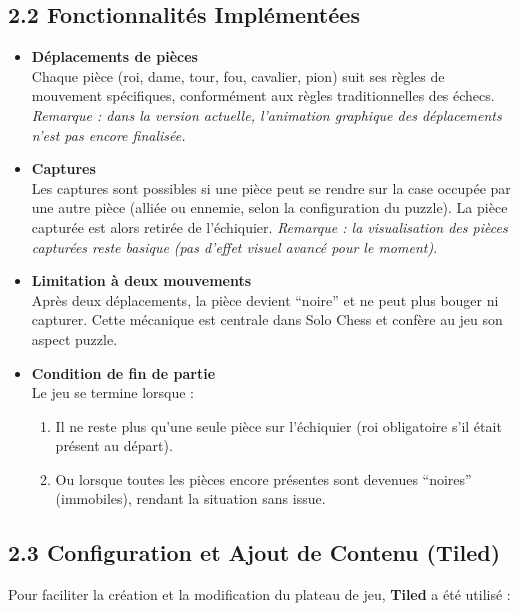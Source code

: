 \documentclass[11pt,a4paper]{article}
\begin{document}
\subsection*{2.2 Fonctionnalités Implémentées}
\begin{itemize}[leftmargin=1.5em]
    \item \textbf{Déplacements de pièces}\\
    Chaque pièce (roi, dame, tour, fou, cavalier, pion) suit ses règles de mouvement spécifiques, conformément aux règles traditionnelles des échecs.
    \emph{Remarque : dans la version actuelle, l’animation graphique des déplacements n’est pas encore finalisée.}

    \item \textbf{Captures}\\
    Les captures sont possibles si une pièce peut se rendre sur la case occupée par une autre pièce (alliée ou ennemie, selon la configuration du puzzle). La pièce capturée est alors retirée de l’échiquier.
    \emph{Remarque : la visualisation des pièces capturées reste basique (pas d’effet visuel avancé pour le moment).}

    \item \textbf{Limitation à deux mouvements}\\
    Après deux déplacements, la pièce devient “noire” et ne peut plus bouger ni capturer. Cette mécanique est centrale dans Solo Chess et confère au jeu son aspect puzzle.

    \item \textbf{Condition de fin de partie}\\
    Le jeu se termine lorsque :
    \begin{enumerate}
        \item Il ne reste plus qu’une seule pièce sur l’échiquier (roi obligatoire s’il était présent au départ).
        \item Ou lorsque toutes les pièces encore présentes sont devenues “noires” (immobiles), rendant la situation sans issue.
    \end{enumerate}
\end{itemize}

\subsection*{2.3 Configuration et Ajout de Contenu (Tiled)}

Pour faciliter la création et la modification du plateau de jeu, \textbf{Tiled} a été utilisé :
\end{document}
